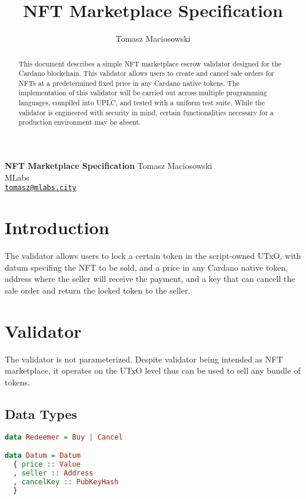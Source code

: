 \documentclass{article}
\title{NFT Marketplace Specification}
\author{Tomasz Maciosowski}
\date{}
\begin{document}
\begin{center}
  \vskip 10mm {\LARGE\bf
      NFT Marketplace Specification
    }
  \vskip 10mm
  Tomasz Maciosowski \\
  MLabs\\
  \href{mailto:tomasz@mlabs.city}{\tt tomasz@mlabs.city} \\
\end{center}

\vskip 5mm

\begin{abstract}
  This document describes a simple NFT marketplace escrow validator designed for the Cardano blockchain.
  This validator allows users to create and cancel sale orders for NFTs at a predetermined fixed price in any Cardano native tokens.
  The implementation of this validator will be carried out across multiple programming languages, compiled into UPLC, and tested with a uniform test suite.
  While the validator is engineered with security in mind, certain functionalities necessary for a production environment may be absent.
\end{abstract}

\section{Introduction}

The validator allows users to lock a certain token in the script-owned UTxO, with datum specifing the NFT to be sold, and a price in any Cardano native token, address where the seller will receive the payment, and a key that can cancell the sale order and return the locked token to the seller.

\section{Validator}

The validator is not parameterized. Despite validator being intended as NFT marketplace, it operates on the UTxO level thus can be used to sell any bundle of tokens.

\subsection{Data Types}
\begin{lstlisting}[language=Haskell]
data Redeemer = Buy | Cancel

data Datum = Datum
  { price :: Value
  , seller :: Address
  , cancelKey :: PubKeyHash
  }
\end{lstlisting}
\end{document}
